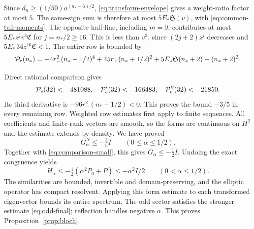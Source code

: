 Since $d_n\ge(1/50)a^{(n_*-6)/2}$, \eqref{eq:transform-envelope} gives a weight-ratio factor at most $5$. The same-sign sum is therefore at most $5E_*\mathfrak S(v)$, with \eqref{eq:common-tail-moments}. The opposite half-line, including $m=0$, contributes at most $5E_*z^jv^3\mathfrak C$ for $j=n_*/2\ge16$. This is less than $v^2$, since $(2j+2)z^j$ decreases and $5E_*\,34z^{16}\mathfrak C<1$. The entire row is bounded by
\begin{equation}\label{eq:even-high}
 \mathcal P_{\rm e}(n_*)=-4r_-^2(n_*-1/2)^4+45r_+(n_*+1/2)^2
 +5E_*\mathfrak S(n_*+2)+(n_*+2)^2.
\end{equation}

Direct rational comparison gives
\[
 \mathcal P_{\rm e}(32)<-481088,\quad
 \mathcal P_{\rm e}'(32)<-166483,\quad
 \mathcal P_{\rm e}''(32)<-21850.
\]
Its third derivative is $-96r_-^2(n_*-1/2)<0$. This proves the bound $-3/5$ in every remaining row. Weighted row estimates first apply to finite sequences. All coefficients and finite-rank vectors are smooth, so the forms are continuous on $H^2$ and the estimate extends by density. We have proved
\[
 G_\alpha^N\le-\tfrac35I\qquad(0\le\alpha\le1/2).
\]
Together with \eqref{eq:comparison-small}, this gives $G_\alpha\le-\tfrac12I$. Undoing the exact congruence yields
\[
 H_\alpha\le-\tfrac12(\alpha^2P_0+P)\le-\alpha^2I/2\qquad(0<\alpha\le1/2).
\]
The similarities are bounded, invertible and domain-preserving, and the elliptic operator has compact resolvent. Applying this form estimate to each transformed eigenvector bounds its entire spectrum. The odd sector satisfies the stronger estimate \eqref{eq:odd-final}; reflection handles negative $\alpha$. This proves Proposition~\ref{prop:bloch}.

